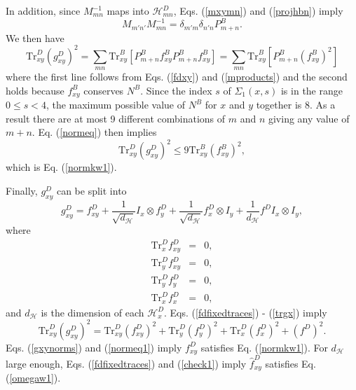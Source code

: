 \documentclass[12pt,amsmath,amssymb,onecolumn]{revtex4-2}
\begin{document}
In addition, since $M_{mn}^{-1}$ maps into $\mathcal{H}^D_{mn}$,
Eqs. (\ref{mxymn}) and (\ref{projhbn}) imply 
\begin{equation}
  \label{mproducts}
  M_{m'n'} M_{mn}^{-1} = \delta_{m'm} \delta_{n'n} P^B_{m + n}.
\end{equation}
We then have
\begin{equation}
  \label{normeq}
  \mathrm{Tr}^D_{xy} ( g^D_{xy})^2 = \sum_{mn} \mathrm{Tr}^B_{xy}[ P^B_{m +n} f^B_{xy}P^B_{m+n} f^B_{xy}]
  =  \sum_{mn} \mathrm{Tr}^B_{xy}[ P^B_{m +n} (f^B_{xy})^2]
\end{equation}
where the first line follows from Eqs. (\ref{fdxy}) and (\ref{mproducts})
and the second holds because $f^B_{xy}$ conserves $N^B$.
Since the index $s$ of $\Sigma_1(x,s)$ is in the range $0 \le s < 4$,
the maximum possible value of $N^B$ for $x$ and $y$ together is 8.
As a result 
there are at most 9 different combinations of $m$ and $n$
giving any value of $m + n$. Eq. (\ref{normeq}) then implies
\begin{equation}
  \label{normeq1}
    \mathrm{Tr}^D_{xy} ( g^D_{xy})^2 \le 9 \mathrm{Tr}^B_{xy}(f^B_{xy})^2,
\end{equation}
which is Eq. (\ref{normkw1}).

Finally, $g^D_{xy}$ can be split into
\begin{equation}
  \label{fdfixedtraces}
  g^D_{xy} = f^D_{xy} + \frac{1}{\sqrt{d_\mathcal{H}}} I_x \otimes f^D_y + 
  \frac{1}{\sqrt{d_\mathcal{H}}} f^D_x  \otimes I_y + \frac{1}{d_\mathcal{H}} f^D I_x \otimes I_y,
\end{equation}
where
\begin{subequations}
  \begin{eqnarray}
    \label{trgxy0}
    \mathrm{Tr}^D_x f^D_{xy} & = & 0, \\
    \label{trgxy1}
    \mathrm{Tr}^D_y f^D_{xy} & = & 0, \\
    \label{trgy}
    \mathrm{Tr}^D_y f^D_y & = & 0, \\
    \label{trgx}
    \mathrm{Tr}^D_x f^D_x & = & 0,
  \end{eqnarray}
\end{subequations}
and $d_\mathcal{H}$ is the dimension of each $\mathcal{H}^D_x$.
Eqs. (\ref{fdfixedtraces}) - (\ref{trgx}) imply
\begin{equation}
  \label{gxynorms}
  \mathrm{Tr}^D_{xy}(g^D_{xy})^2 = \mathrm{Tr}^D_{xy}(f^D_{xy})^2 + \mathrm{Tr}^D_y(f^D_y)^2 +
  \mathrm{Tr}^D_x(f^D_x)^2 + (f^D)^2.
\end{equation}
Eqs. (\ref{gxynorms}) and (\ref{normeq1}) imply $f^D_{xy}$ satisfies Eq. (\ref{normkw1}). For $d_\mathcal{H}$ large enough,
Eqs. (\ref{fdfixedtraces}) and (\ref{check1}) imply $\hat{f}^D_{xy}$ satisfies Eq. (\ref{omegaw1}).
\end{document}

